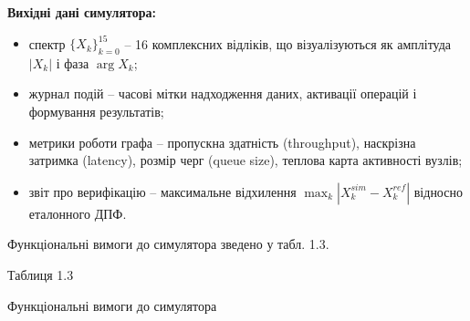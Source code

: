 \documentclass[
]{article}
\begin{document}
\textbf{Вихідні дані симулятора:}

\begin{itemize}
\item
  спектр \(\{ X_{k}\}_{k = 0}^{15}\) -- 16 комплексних відліків, що
  візуалізуються як амплітуда \(|X_{k}|\) і фаза \(\arg X_{k}\);
\item
  журнал подій -- часові мітки надходження даних, активації операцій і
  формування результатів;
\item
  метрики роботи графа -- пропускна здатність (throughput), наскрізна
  затримка (latency), розмір черг (queue size), теплова карта активності
  вузлів;
\item
  звіт про верифікацію -- максимальне відхилення
  \(\max_{k}|X_{k}^{sim} - X_{k}^{ref}|\) відносно еталонного ДПФ.
\end{itemize}

Функціональні вимоги до симулятора зведено у табл. 1.3.

Таблиця 1.3

Функціональні вимоги до симулятора
\end{document}

